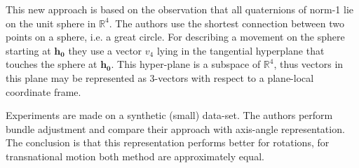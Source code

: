 \documentclass[10pt]{article}         %
\begin{document}
This new approach is based on the observation that all quaternions of
norm-1 lie on the unit sphere in $\mathbb{R}^4$.  The authors use the
shortest connection between two points on a sphere, i.e. a great
circle.  For describing a movement on the sphere starting at
$\mathbf{h_0}$ they use a vector $v_4$ lying in the tangential
hyperplane that touches the sphere at $\mathbf{h_0}$. This hyper-plane
is a subspace of $\mathbb{R}^4$, thus vectors in this plane may be
represented as 3-vectors with respect to a plane-local coordinate
frame.

Experiments are made on a synthetic (small) data-set.  The authors
perform bundle adjustment and compare their approach with axis-angle
representation.  The conclusion is that this representation performs
better for rotations, for transnational motion both method are
approximately equal.

{}

\end{document}
